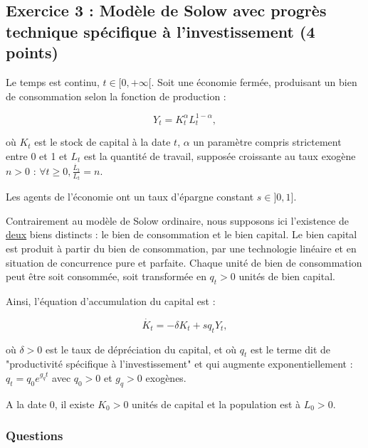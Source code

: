 \documentclass[a4paper,12pt]{article}
\begin{document}
\subsection*{Exercice 3 : Modèle de Solow avec progrès technique spécifique à l’investissement (4 points)}

Le temps est continu, $t \in [0, +\infty[$. Soit une économie fermée, produisant un bien de consommation selon la fonction de production :

\begin{equation}
    Y_t = K_t^{\alpha} L_t^{1-\alpha},
\end{equation}

où $K_t$ est le stock de capital à la date $t$, $\alpha$ un paramètre compris strictement entre 0 et 1 et $L_t$ est la quantité de travail, supposée croissante au taux exogène $n > 0$ :
$\forall t\geq 0, \frac{\dot{L_t}}{L_t} = n$.

Les agents de l’économie ont un taux d’épargne constant  $s \in ]0,1]$.

Contrairement au modèle de Solow ordinaire, nous supposons ici l’existence 
de \underline{deux} biens distincts : le bien de consommation et le bien capital. 
Le bien capital est produit à partir du bien de consommation, par une technologie linéaire
et en situation de concurrence pure et parfaite. Chaque unité de bien de consommation peut
être soit consommée, soit transformée en $q_t > 0$ unités de bien capital.

Ainsi, l’équation d’accumulation du capital est :

\begin{equation}
    \dot{K_t} = - \delta K_t + s q_t Y_t,
\end{equation}

où $\delta > 0$ est le taux de dépréciation du capital, et où $q_t$ est le terme dit de "productivité
spécifique à l'investissement" et qui augmente exponentiellement : $q_t = q_0 e^{g_q t}$ avec $q_0 > 0$ et $g_q > 0$ exogènes.

A la date 0, il existe $K_0>0$ unités de capital et la population est à $L_0>0$.

\subsubsection*{Questions}
\end{document}

